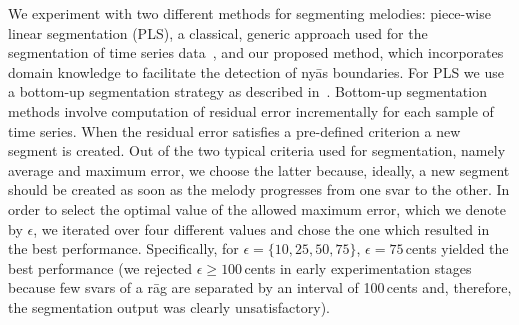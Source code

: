 
We experiment with two different methods for segmenting melodies: piece-wise linear segmentation (PLS), a classical, generic approach used for the segmentation of time series data~\cite{keogh2004segmenting}, and our proposed method, which incorporates domain knowledge to facilitate the detection of ny\={a}s boundaries. For PLS we use a bottom-up segmentation strategy as described in~\cite{keogh2004segmenting}. Bottom-up segmentation methods involve computation of residual error incrementally for each sample of time series. When the residual error satisfies a pre-defined criterion a new segment is created. Out of the two typical criteria used for segmentation, namely average and maximum error, we choose the latter because, ideally, a new segment should be created as soon as the melody progresses from one svar to the other. In order to select the optimal value of the allowed maximum error, which we denote by $\epsilon$, we iterated over four different values and chose the one which resulted in the best performance. Specifically, for $\epsilon=\lbrace 10, 25, 50, 75\rbrace$, $\epsilon=75$\,cents yielded the best performance (we rejected $\epsilon\geq 100$\,cents in early experimentation stages because few svars of a r\={a}g are separated by an interval of 100\,cents and, therefore, the segmentation output was clearly unsatisfactory).

